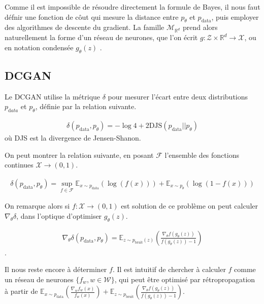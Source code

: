 Comme il est impossible de résoudre directement la formule de Bayes, il nous faut défnir une fonction de côut qui mesure la distance entre $p_{\theta}$ et $p_{\mathrm{data}}$, puis employer des algorithmes de descente du gradient. La famille $\mathcal{M}_{\mathbb{R}^d}$ prend alors naturellement la forme d'un réseau de neurones, que l'on écrit $g : \mathcal{Z} \times \mathbb{R}^{d} \longrightarrow \mathcal{X}$, ou en notation condensée $g_{\theta}(z)$ .

\subsection{DCGAN} \label{DCGAN_prob}

Le DCGAN utilise la métrique $\delta$ pour mesurer l'écart entre deux distributions $p_{\mathrm data}$ et $p_{\theta}$, définie par la relation suivante. 

$$\begin{aligned} \delta(p_{\mathrm{data}}, p_{\theta}) = -\log 4 + 2 \mathrm{DJS}(p_{\mathrm{data}} || p_{\theta})\end{aligned}$$ où DJS est la divergence de Jensen-Shanon.

On peut montrer \cite{goodfellow_generative_2014} la relation suivante, en posant $\mathcal{F}$ l'ensemble des fonctions continues $\mathcal{X} \longrightarrow (0,1)$.

$$\begin{aligned} \delta(p_{\mathrm{data}}, p_{\theta}) = \sup_{f\in\mathcal{F}} \mathbb{E}_{x \sim p_{\mathrm{data}}}(\log (f(x))) + \mathbb{E}_{x \sim p_{\theta}}(\log (1 - f(x)))\end{aligned}$$

On remarque alors si $f: \mathcal{X} \longrightarrow (0,1)$ est solution de ce problème on peut calculer $\nabla_{\theta} \delta$, dans l'optique d'optimiser $g_{\theta}(z)$. 

$$\begin{aligned}\nabla_{\theta} \delta(p_{\mathrm{data}}, p_{\theta}) = \mathbb{E}_{z\sim p_{\mathrm{bruit}}(z)} \left( \frac{\nabla_{\theta}f(g_{\theta}(z))}{f(g_{\theta}(z)) -1} \right)\end{aligned}$$.

Il nous reste encore à déterminer $f$. Il est intuitif de chercher à calculer $f$ comme un réseau de neurones $\{f_{w}, w \in \mathcal{W} \}$, qui peut être optimisé par rétropropagation à partir de  $\mathbb{E}_{x \sim p_{\mathrm{data}}}\left(\frac{\nabla_{w}f_{w}(x)}{f_{w}(x)}\right)+ \mathbb{E}_{z \sim p_{\mathrm{bruit}}}\left(\frac{\nabla_{\theta}f(g_{\theta}(z))}{f(g_{\theta}(z)) -1}\right)$.

